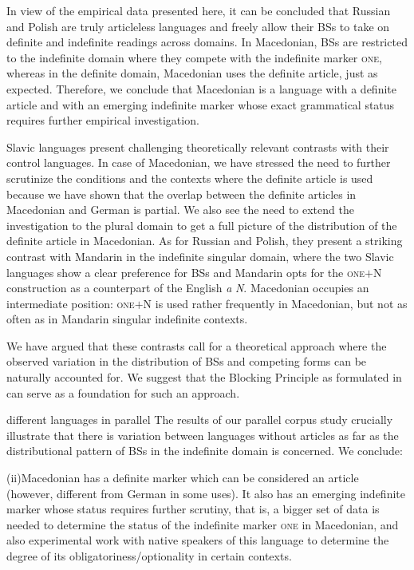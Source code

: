 \documentclass[output=paper,colorlinks,citecolor=brown]{langscibook}
\begin{document}
In view of the empirical data presented here, it can be concluded that Russian and Polish are truly articleless languages and freely allow their BSs to take on definite and indefinite readings across domains. In Macedonian, BSs are restricted to the indefinite domain where they compete with the indefinite marker \textsc{one}, whereas in the definite domain, Macedonian uses the definite article, just as expected. Therefore, we conclude that Macedonian is a language with a definite article and with an emerging indefinite marker whose exact grammatical status requires further empirical investigation. 

Slavic languages present challenging theoretically relevant contrasts with their control languages. In case of Macedonian, we have stressed the need to further scrutinize the conditions and the contexts where the definite article is used because we have shown that the overlap between the definite articles in Macedonian and German is partial. We also see the need to extend the investigation to the plural domain to get a full picture of the distribution of the definite article in Macedonian. As for Russian and Polish, they present a striking contrast with Mandarin in the indefinite singular domain, where the two Slavic languages show a clear preference for BSs and Mandarin opts for the \textsc{one}$+$N construction as a counterpart of the English \textit{a} \textit{N}. Macedonian occupies an intermediate position: \textsc{one}$+$N is used rather frequently in Macedonian, but not as often as in Mandarin singular indefinite contexts. 

We have argued that these contrasts call for a theoretical approach where the observed variation in the distribution of BSs and competing forms can be naturally accounted for. We suggest that the Blocking Principle as formulated in \citet{Chierchia1998} can serve as a foundation for such an approach. 





\iffalse

different languages in parallel
The results of our parallel corpus study crucially illustrate that there is variation between languages without articles as far as the distributional pattern of BSs in the indefinite domain is concerned. 
We conclude:

(ii)Macedonian has a definite marker which can be considered an article (however, different from German in some uses). It also has an emerging indefinite marker whose status requires further scrutiny, that is, a bigger set of data is needed to determine the status of the indefinite marker \textsc{one} in Macedonian, and also experimental work with native speakers of this language to determine the degree of its obligatoriness/optionality in certain contexts.
\end{document}
